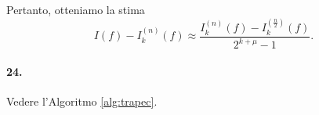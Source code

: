 \noindent Pertanto, otteniamo la stima
\begin{equation*}
    I(f)-I_k^{(n)}(f) \approx \frac{I_k^{(n)}(f)-I_k^{(\frac{n}{2})}(f)}{2^{k+\mu}-1}.
\end{equation*}

\paragraph{24.} Vedere l'Algoritmo \ref{alg:trapec}.
